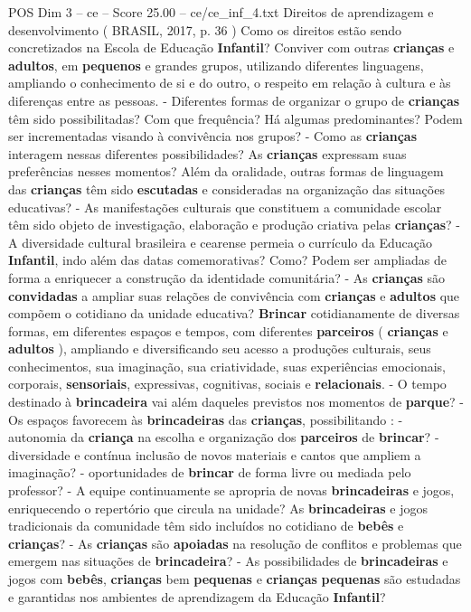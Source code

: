\begin{textsample}{POS Dim 3 – ce – Score 25.00 – ce/ce\_inf\_4.txt}  \label{ex:f3_pos_056}
Direitos de aprendizagem e desenvolvimento ( BRASIL, 2017, p. 36 ) Como os direitos estão sendo concretizados na Escola de Educação \textbf{Infantil}?
Conviver com outras \textbf{crianças} e \textbf{adultos}, em \textbf{pequenos} e grandes grupos, utilizando diferentes linguagens, ampliando o conhecimento de si e do outro, o respeito em relação à cultura e às diferenças entre as pessoas. - Diferentes formas de organizar o grupo de \textbf{crianças} têm sido possibilitadas?
Com que frequência?
Há algumas predominantes?
Podem ser incrementadas visando à convivência nos grupos? - Como as \textbf{crianças} interagem nessas diferentes possibilidades?
As \textbf{crianças} expressam suas preferências nesses momentos?
Além da oralidade, outras formas de linguagem das \textbf{crianças} têm sido \textbf{escutadas} e consideradas na organização das situações educativas? - As manifestações culturais que constituem a comunidade escolar têm sido objeto de investigação, elaboração e produção criativa pelas \textbf{crianças}? - A diversidade cultural brasileira e cearense permeia o currículo da Educação \textbf{Infantil}, indo além das datas comemorativas?
Como?
Podem ser ampliadas de forma a enriquecer a construção da identidade comunitária? - As \textbf{crianças} são \textbf{convidadas} a ampliar suas relações de convivência com \textbf{crianças} e \textbf{adultos} que compõem o cotidiano da unidade educativa? \textbf{Brincar} cotidianamente de diversas formas, em diferentes espaços e tempos, com diferentes \textbf{parceiros} ( \textbf{crianças} e \textbf{adultos} ), ampliando e diversificando seu acesso a produções culturais, seus conhecimentos, sua imaginação, sua criatividade, suas experiências emocionais, corporais, \textbf{sensoriais}, expressivas, cognitivas, sociais e \textbf{relacionais}. - O tempo destinado à \textbf{brincadeira} vai além daqueles previstos nos momentos de \textbf{parque}? - Os espaços favorecem às \textbf{brincadeiras} das \textbf{crianças}, possibilitando : - autonomia da \textbf{criança} na escolha e organização dos \textbf{parceiros} de \textbf{brincar}? - diversidade e contínua inclusão de novos materiais e cantos que ampliem a imaginação? - oportunidades de \textbf{brincar} de forma livre ou mediada pelo professor? - A equipe continuamente se apropria de novas \textbf{brincadeiras} e jogos, enriquecendo o repertório que circula na unidade?
As \textbf{brincadeiras} e jogos tradicionais da comunidade têm sido incluídos no cotidiano de \textbf{bebês} e \textbf{crianças}? - As \textbf{crianças} são \textbf{apoiadas} na resolução de conflitos e problemas que emergem nas situações de \textbf{brincadeira}? - As possibilidades de \textbf{brincadeiras} e jogos com \textbf{bebês}, \textbf{crianças} bem \textbf{pequenas} e \textbf{crianças} \textbf{pequenas} são estudadas e garantidas nos ambientes de aprendizagem da Educação \textbf{Infantil}?

\end{textsample}
